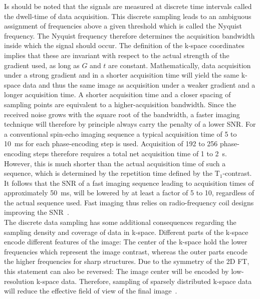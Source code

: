 Is should be noted that the signals are measured 
at discrete time intervals called the dwell-time of data acquisition. This discrete sampling leads to an ambiguous assignment of frequencies above a given threshold which is called the Nyquist frequency. The Nyquist frequency therefore determines the acquisition bandwidth inside which the signal should occur. The definition of the k-space coordinates implies that these are invariant with respect to the actual strength of the gradient used, as long as $G$ and $t$ are constant. Mathematically, data acquisition under a strong gradient and in a shorter acquisition time will yield the same k-space data and thus the same image as acquisition under a weaker gradient and a longer acquisition time. A shorter acquisition time and a closer spacing of sampling points are equivalent to a higher-acquisition bandwidth. Since the received noise grows with the square root of the bandwidth, a faster imaging technique will therefore by principle always carry the penalty of a lower SNR.
For a conventional spin-echo imaging sequence
a typical acquisition time of 5 to 10~ms for each phase-encoding step is used. Acquisition of 
192 to 256 phase-encoding steps therefore requires a total net acquisition time of 1 to 2~s. However, this is much shorter than the 
actual
acquisition time of such a sequence, which is determined by the repetition time defined by the $\text{T}_1$-contrast. 
It 
follows that the SNR of a fast imaging sequence leading to acquisition times of approximately 50~ms, will be lowered by at least a factor of 5 to 10, regardless of the actual sequence used. 
Fast imaging thus relies on radio-frequency coil designs improving the SNR~\cite{SamplingStrategies}.\\
The discrete data sampling has some additional consequences regarding the sampling density and coverage of data in k-space. Different parts of the k-space encode different features of the image: The center of the k-space hold the lower frequencies which represent the image contrast, whereas the outer parts encode the higher frequencies for sharp structures. Due to the symmetry of the 2D FT, this statement can also be reversed: The image center will be encoded by low-resolution k-space data. Therefore, sampling of sparsely distributed k-space data will reduce the effective field of view of the final image~\cite{AdvancesPI,SamplingStrategies}. \\
